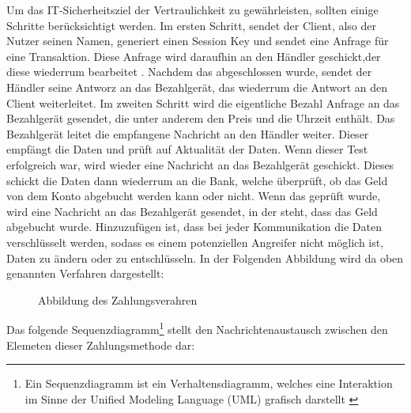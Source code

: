 Um das IT-Sicherheitsziel der Vertraulichkeit zu gewährleisten, sollten einige Schritte berücksichtigt
werden. Im ersten Schritt, sendet der Client, also der Nutzer seinen Namen, generiert einen Session Key 
und sendet eine Anfrage für eine Transaktion. Diese Anfrage wird daraufhin an den Händler
geschickt,der diese wiederrum bearbeitet \cite{refart:JTAS}. Nachdem das abgeschlossen wurde, sendet der Händler 
seine Antworz an das Bezahlgerät, das wiederrum die Antwort an den Client weiterleitet. Im zweiten Schritt wird die 
eigentliche Bezahl Anfrage an das Bezahlgerät gesendet, die unter anderem den Preis und die Uhrzeit enthält.
Das Bezahlgerät leitet die empfangene Nachricht an den Händler weiter. Dieser empfängt die Daten und 
prüft auf Aktualität der Daten. Wenn dieser Test erfolgreich war, wird wieder eine Nachricht an das 
Bezahlgerät geschickt. Dieses schickt die Daten dann wiederrum an die Bank, welche überprüft, ob das
Geld von dem Konto abgebucht werden kann oder nicht. Wenn das geprüft wurde, wird eine Nachricht an
das Bezahlgerät gesendet, in der steht, dass das Geld abgebucht wurde. Hinzuzufügen ist, dass bei jeder
Kommunikation die Daten verschlüsselt werden, sodass es einem potenziellen Angreifer nicht möglich ist,
Daten zu ändern oder zu entschlüsseln. In der Folgenden Abbildung wird da oben genannten Verfahren
dargestellt:


\vfill
\begin{figure}[H]
    \caption{Abbildung des Zahlungsverahren \cite{refart:JTAS}}
    \label{fig:refart:JTAS}
\end{figure}
\vfill


Das folgende Sequenzdiagramm\footnote{Ein Sequenzdiagramm ist ein Verhaltensdiagramm, welches
eine Interaktion im Sinne der Unified Modeling Language (UML) grafisch darstellt \cite{refbook:IASE}} 
stellt den Nachrichtenaustausch zwischen den Elemeten dieser Zahlungsmethode dar:

